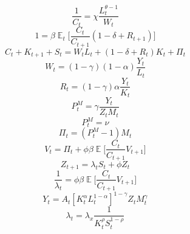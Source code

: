 \documentclass{article}
\DeclareMathOperator{\E}{\mathbb{E}}
\begin{document}
\begin{equation}
\frac{1}{C_t} = \chi \frac{L_t^{\theta - 1} }{W_t}
\end{equation}
\begin{equation}
1 = \beta \E_t \bigg[\frac{C_t}{C_{t+1}} (1 - \delta + R_{t+1})  \bigg]
\end{equation}
\begin{equation}
C_t + K_{t+1} + S_t = W_tL_t + (1- \delta + R_{t})K_t + \Pi_t
\end{equation}
\begin{equation}
W_t = (1 - \gamma)(1 - \alpha) \frac{Y_t}{L_t}
\end{equation}
\begin{equation}
R_t = (1 - \gamma)\alpha \frac{Y_t}{K_t}
\end{equation}
\begin{equation}
P^M_t = \gamma \frac{Y_t}{Z_t M_t}
\end{equation}
\begin{equation}
P_t^M = \nu
\end{equation}
\begin{equation}
\Pi_t = (P_t^M - 1)M_t
\end{equation}
\begin{equation}
V_t = \Pi_t + \phi \beta \E \bigg[ \frac{C_t}{C_{t+1}}  V_{t+1} \bigg]
\end{equation}
\begin{equation}
Z_{t+1} = \lambda_t S_t + \phi Z_t
\end{equation}
\begin{equation}
\frac{1}{\lambda_t} = \phi \beta \E \bigg[ \frac{C_t}{C_{t+1}}  V_{t+1} \bigg]
\end{equation}
\begin{equation}
Y_t = A_t[K_t^{\alpha}L_t^{1 - \alpha}]^{1 - \gamma}Z_tM_t^{\gamma}
\end{equation}
\begin{equation}
\lambda_t = \lambda_x \frac{1}{K_t^{\rho}S_t^{1 - \rho}}
\end{equation}
	
\end{document}
